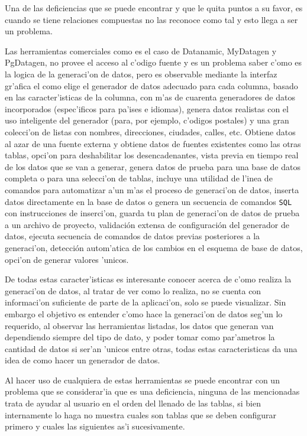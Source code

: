 Una de las deficiencias que se puede encontrar y que le quita puntos a su favor, es cuando se tiene relaciones compuestas no las reconoce como tal y esto llega a ser un problema.

Las herramientas comerciales como es el caso de Datanamic, MyDatagen y PgDatagen, no provee el acceso al c'odigo fuente y es un problema saber c'omo es la logica de la generaci'on de datos, pero es observable mediante la interfaz gr'afica el como elige el generador de datos adecuado para cada columna, basado en las caracter'isticas de la columna, con m'as de cuarenta generadores de datos incorporados (espec'ificos para pa'ises e idiomas), genera datos realistas con el uso inteligente del generador (para, por ejemplo, c'odigos postales) y una gran colecci'on de listas con nombres, direcciones, ciudades, calles, etc. Obtiene datos al azar de una fuente externa y obtiene datos de fuentes existentes como las otras tablas, opci'on para deshabilitar los desencadenantes, vista previa en tiempo real de los datos que se van a generar, genera datos de prueba para una base de datos completa o para una selecci'on de tablas, incluye una utilidad de l'inea de comandos para automatizar a'un m'as el proceso de generaci'on de datos, inserta datos directamente en la base de datos o genera un secuencia de comandos \texttt{SQL} con instrucciones de inserci'on, guarda tu plan de generaci'on de datos de prueba a un archivo de proyecto, validación extensa de configuraci\'on del generador de datos, ejecuta secuencia de comandos de datos previas posteriores a la generaci'on, detecci\'on autom'atica de los cambios en el esquema de base de datos, opci'on de generar valores 'unicos.

De todas estas caracter'isticas es interesante conocer acerca de c'omo realiza la generaci'on de datos, al tratar de ver como lo realiza, no se cuenta con informaci'on suficiente de parte de la aplicaci'on, solo se puede visualizar. Sin embargo el objetivo es entender c'omo hace la generaci'on de datos seg'un lo requerido, al observar las herramientas listadas, los datos que generan van dependiendo siempre del tipo de dato, y poder tomar como par'ametros la cantidad de datos si ser'an 'unicos entre otras, todas estas caracteristicas da una idea de como hacer un generador de datos.

Al hacer uso de cualquiera de estas herramientas se puede encontrar con un problema que se considerar'ia que es una deficiencia, ninguna de las mencionadas trata de ayudar al usuario en el orden del llenado de las tablas, si bien internamente lo haga no muestra cuales son tablas que se deben configurar primero y cuales las siguientes as'i sucesivamente.